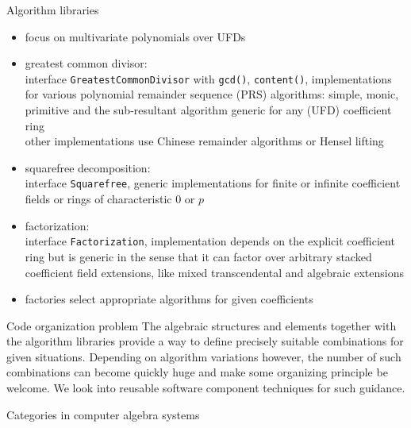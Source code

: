 \documentclass[final]{beamer}
\newcommand{\code}[1]{\texttt{#1}}
\begin{document}
\begin{frame}[fragile]
\begin{columns}[t]
\begin{column}{.3\linewidth}
  \begin{block}{\large Algorithm libraries}
  \scriptsize 
  \begin{itemize}
  \item focus on multivariate polynomials over UFDs
  \item greatest common divisor: \\
        interface \code{Greatest\-Common\-Divisor} with \code{gcd()}, \code{content()}, 
        implementations for various polynomial remainder sequence (PRS) algorithms: 
        simple, monic, primitive and the sub-resultant algorithm 
        generic for any (UFD) coefficient ring \\
        other implementations use Chinese remainder algorithms or Hensel lifting
  \item squarefree decomposition: \\
        interface \code{Square\-free}, 
        generic implementations for finite or infinite coefficient fields 
        or rings of characteristic $0$ or $p$
  \item factorization: \\
        interface \code{Factorization}, 
        implementation depends on the explicit coefficient ring 
        but is generic in the sense that it can factor
        over arbitrary stacked coefficient field extensions, like mixed
        transcendental and algebraic extensions
  \item factories select appropriate algorithms for given coefficients
  \end{itemize}
  \end{block}
  \hfill
  \begin{block}{\large Code organization problem}
  \scriptsize
The algebraic structures and elements together with the algorithm
libraries provide a way to define precisely suitable combinations
for given situations. Depending on algorithm variations however,
the number of such combinations can become quickly huge and make
some organizing principle be welcome. We look into reusable
software component techniques for such guidance.
  \end{block}
  \hfill
  \begin{block}{\large Categories in computer algebra systems}

\end{block}
\end{column}
\end{columns}
\end{frame}
\end{document}
